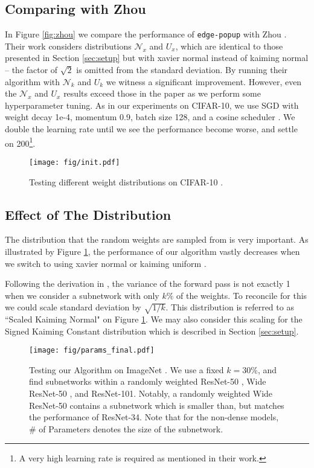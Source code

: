 \documentclass[10pt,twocolumn,letterpaper]{article}
\newcommand{\alg}{\texttt{edge-popup} }
\begin{document}
\subsection{Comparing with Zhou \etal \cite{supermask}} \label{sec:baseline}

In Figure \ref{fig:zhou} we compare the performance of \alg with Zhou \etal. Their work considers distributions $\mathcal{N}_x$ and $U_x$, which are identical to those presented in Section \ref{sec:setup} but with xavier normal \cite{glorot} instead of kaiming normal \cite{kaiming-init} -- the factor of $\sqrt{2}$ is omitted from the standard deviation. By running their algorithm with $\mathcal{N}_k$ and $U_k$ we witness a significant improvement. However, even the $\mathcal{N}_x$ and $U_x$ results exceed those in the paper as we perform some hyperparameter tuning. As in our experiments on CIFAR-10, we use SGD with weight decay 1e-4, momentum 0.9, batch size 128, and a cosine scheduler \cite{cosinelr}. We double the learning rate until we see the performance become worse, and settle on 200\footnote{A very high learning rate is required as mentioned in their work.}.

\begin{figure}[h]
    \centering
    \texttt{[image: fig/init.pdf]}
    \caption{Testing different weight distributions on CIFAR-10 \cite{cifar}.}
    \label{fig:init}
\end{figure}

\subsection{Effect of The Distribution} \label{sec:init}

The distribution that the random weights are sampled from is very important. As illustrated by Figure \ref{fig:init}, the performance of our algorithm vastly decreases when we switch to using xavier normal \cite{glorot} or kaiming uniform \cite{kaiming-init}.

Following the derivation in \cite{kaiming-init}, the variance of the forward pass is not exactly 1 when we consider a subnetwork with only $k\%$ of the weights. To reconcile for this we could scale standard deviation by $\sqrt{1/k}$. This distribution is referred to as ``Scaled Kaiming Normal" on Figure \ref{fig:init}. We may also consider this scaling for the Signed Kaiming Constant distribution which is described in Section \ref{sec:setup}.

\begin{figure}[h]
\begin{center}
\texttt{[image: fig/params\_final.pdf]}
  
\end{center}
  \caption{Testing our Algorithm on ImageNet \cite{imagenet}. We use a fixed $k = 30\%$, and find subnetworks within a randomly weighted ResNet-50 \cite{resnet}, Wide ResNet-50 \cite{wideresnet}, and ResNet-101. Notably, a randomly weighted Wide ResNet-50 contains a subnetwork which is smaller than, but matches the performance of ResNet-34. Note that for the non-dense models, \# of Parameters denotes the size of the subnetwork.}
\label{fig:params}
\end{figure}
\end{document}
